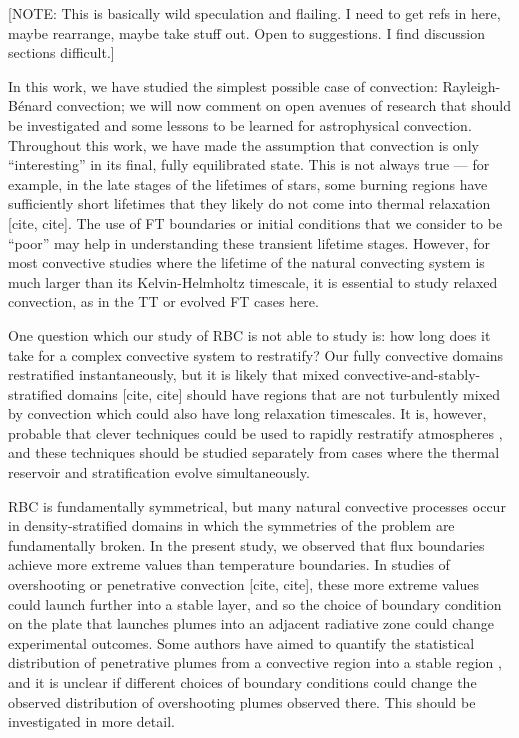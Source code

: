 \documentclass[aps, pre, onecolumn, nofootinbib, notitlepage, groupedaddress, amsfonts, amssymb, amsmath, longbibliography, superscriptaddress]{revtex4-1}
\newcommand{\RB}{Rayleigh-B\'{e}nard }
\begin{document}
[NOTE: This is basically wild speculation and flailing. I need to get refs in here, maybe rearrange, maybe take stuff out. Open to suggestions. I find discussion sections difficult.]

In this work, we have studied the simplest possible case of convection: \RB convection; we will now comment on open avenues of research that should be investigated and some lessons to be learned for astrophysical convection.
Throughout this work, we have made the assumption that convection is only ``interesting'' in its final, fully equilibrated state.
This is not always true --- for example, in the late stages of the lifetimes of stars, some burning regions have sufficiently short lifetimes that they likely do not come into thermal relaxation [cite, cite].
The use of FT boundaries or initial conditions that we consider to be ``poor'' may help in understanding these transient lifetime stages.
However, for most convective studies where the lifetime of the natural convecting system is much larger than its Kelvin-Helmholtz timescale, it is essential to study relaxed convection, as in the TT or evolved FT cases here.

One question which our study of RBC is not able to study is: how long does it take for a complex convective system to restratify?
Our fully convective domains restratified instantaneously, but it is likely that mixed convective-and-stably-stratified domains [cite, cite] should have regions that are not turbulently mixed by convection which could also have long relaxation timescales.
It is, however, probable that clever techniques could be used to rapidly restratify atmospheres \cite{anders&all2018}, and these techniques should be studied separately from cases where the thermal reservoir and stratification evolve simultaneously.

RBC is fundamentally symmetrical, but many natural convective processes occur in density-stratified domains in which the symmetries of the problem are fundamentally broken.
In the present study, we observed that flux boundaries achieve more extreme values than temperature boundaries.
In studies of overshooting or penetrative convection [cite, cite], these more extreme values could launch further into a stable layer, and so the choice of boundary condition on the plate that launches plumes into an adjacent radiative zone could change experimental outcomes.
Some authors have aimed to quantify the statistical distribution of penetrative plumes from a convective region into a stable region \cite{pratt&all2017, korre&all2019}, and it is unclear if different choices of boundary conditions could change the observed distribution of overshooting plumes observed there.
This should be investigated in more detail.
\end{document}
